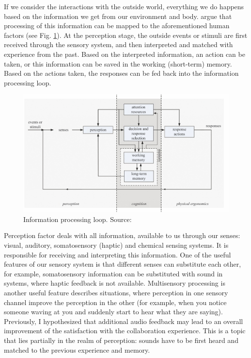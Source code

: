 
If we consider the interactions with the outside world, everything we do happens based on the information we get from our environment and body. \parencite{jr_3d_2017} argue that processing of this information can be mapped to the aforementioned human factors (see Fig. \ref{fig:informationprocessingloop}).
At the perception stage, the outside events or stimuli are first received through the sensory system, and then interpreted and matched with experience from the past. Based on the interpreted information, an action can be taken, or this information can be saved in the working (short-term) memory. 
Based on the actions taken, the responses can be fed back into the information processing loop.

\begin{figure}
	\centering
	\includegraphics[width=0.7\linewidth]{figures/placeholders/information_processing_loop}
	\caption{Information processing loop. Source: \parencite{jr_3d_2017}} %
	\label{fig:informationprocessingloop}
\end{figure}

Perception factor deals with all information, available to us through our senses: visual, auditory, somatosensory (haptic) and chemical sensing systems. It is responsible for receiving and interpreting this information.
One of the useful features of our sensory system is that different senses can substitute each other, for example, somatosensory information can be substituted with sound in systems, where haptic feedback is not available. Multisensory processing is another useful feature describes situations, where perception in one sensory channel improve the perception in the other (for example, when you notice someone waving at you and suddenly start to hear what they are saying).
Previously, I hypothesized that additional audio feedback may lead to an overall improvement of the satisfaction with the collaboration experience. This is a topic that lies partially in the realm of perception: sounds have to be first heard and matched to the previous experience and memory.

